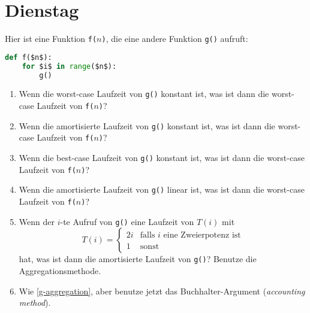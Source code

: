 \documentclass{uebung_cs}
\begin{document}
\section*{Dienstag}
\begin{exercise}
    Hier ist eine Funktion \texttt{f($n$)}, die eine andere Funktion \texttt{g()} aufruft:
    \begin{lstlisting}[frame=single,frameround=tttt,xleftmargin=2em,linewidth=0.5\textwidth,numbers=none,language=Python]
def f($n$):
    for $i$ in range($n$):
        g()
\end{lstlisting}
    \begin{enumerate}
        \item Wenn die worst-case Laufzeit von \texttt{g()} konstant ist, was ist dann die worst-case Laufzeit von \texttt{f($n$)}?
        \item Wenn die amortisierte Laufzeit von \texttt{g()} konstant ist, was ist dann die worst-case Laufzeit von \texttt{f($n$)}?
        \item Wenn die best-case Laufzeit von \texttt{g()} konstant ist, was ist dann die worst-case Laufzeit von \texttt{f($n$)}?
        \item Wenn die amortisierte Laufzeit von \texttt{g()} linear ist, was ist dann die worst-case Laufzeit von \texttt{f($n$)}?
        \item\mittel\label{g-aggregation} Wenn der $i$-te Aufruf von \texttt{g()} eine Laufzeit von $T(i)$ mit
              \[T(i) = \begin{cases} 2i & \text{falls $i$ eine Zweierpotenz ist} \\ 1 & \text{sonst} \end{cases}\]
              hat, was ist dann die amortisierte Laufzeit von \texttt{g()}?
              Benutze die Aggregationsmethode.
        \item\mittel Wie \ref{g-aggregation}, aber benutze jetzt das Buchhalter-Argument (\textit{accounting method}).
    \end{enumerate}
\end{exercise}

\end{document}
